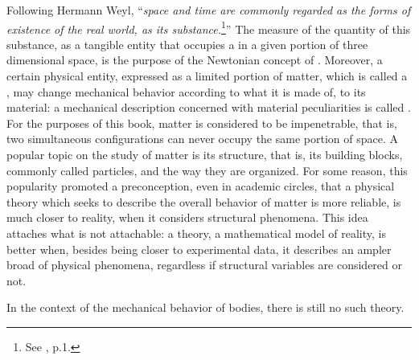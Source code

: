 Following Hermann Weyl, ``\emph{space and time are commonly regarded as the forms of existence of the real world,  as its substance.}\footnote{See \cite{weyl_1952_2}, p.1.}'' The measure of the quantity of this substance, as a tangible entity that occupies a  in a given portion of three dimensional space, is the purpose of the Newtonian concept of . Moreover, a certain physical entity, expressed as a limited portion of matter, which is called a , may change mechanical behavior according to what it is made of, to its material: a mechanical description concerned with material peculiarities is called . For the purposes of this book, matter is considered to be impenetrable, that is, two simultaneous configurations can never occupy the same portion of space. A popular topic on the study of matter is its structure, that is, its building blocks, commonly called particles, and the way they are organized. For some reason, this popularity promoted a preconception, even in academic circles, that a physical theory which seeks to describe the overall behavior of matter is more reliable, is much closer to reality, when it considers structural phenomena. This idea attaches what is not attachable: a theory, a mathematical model of reality, is better when, besides being closer to experimental data, it describes an ampler broad of physical phenomena, regardless if structural variables are considered or not.  


In the context of the mechanical behavior of bodies, there is still no such theory. 







